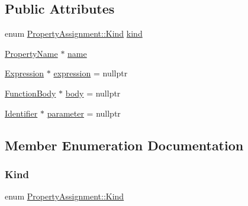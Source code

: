 \subsection*{Public Attributes}
\begin{DoxyCompactItemize}
\item 
enum \hyperlink{struct_property_assignment_a123a67b3e1b5d04a4a34b8d528e9fc96}{Property\+Assignment\+::\+Kind} \hyperlink{struct_property_assignment_a7cb6c2f32adf600bb23564cfe6dc0463}{kind}
\item 
\hyperlink{struct_property_name}{Property\+Name} $\ast$ \hyperlink{struct_property_assignment_a5e0dc6f37850bd4ae74b811f6548e376}{name}
\item 
\hyperlink{struct_expression}{Expression} $\ast$ \hyperlink{struct_property_assignment_addee7ee5b0743c84303d1f3fad4a8a38}{expression} = nullptr
\item 
\hyperlink{struct_function_body}{Function\+Body} $\ast$ \hyperlink{struct_property_assignment_a8e2a28f8fa96db3a64a91adad7a64ca1}{body} = nullptr
\item 
\hyperlink{struct_identifier}{Identifier} $\ast$ \hyperlink{struct_property_assignment_a1f28fd75fe300211ee934a65d33650bc}{parameter} = nullptr
\end{DoxyCompactItemize}


\subsection{Member Enumeration Documentation}
\mbox{\label{struct_property_assignment_a123a67b3e1b5d04a4a34b8d528e9fc96}} 
\subsubsection{\texorpdfstring{Kind}{Kind}}
{\footnotesize\ttfamily enum \hyperlink{struct_property_assignment_a123a67b3e1b5d04a4a34b8d528e9fc96}{Property\+Assignment\+::\+Kind}\hspace{0.3cm}{\ttfamily [strong]}}

